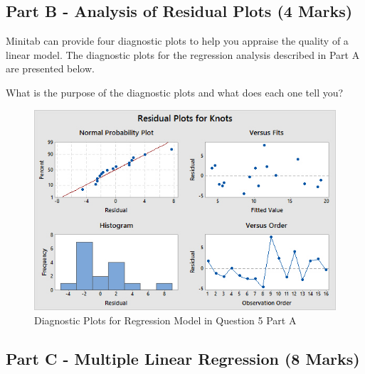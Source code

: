 \documentclass[a4paper,12pt]{article}
\begin{document}
%	
%	
%	
\newpage

\subsection*{Part B - Analysis of Residual Plots (4 Marks)}
Minitab can provide four diagnostic plots to help you appraise the quality of a linear model. The diagnostic plots for the regression analysis described in Part A are presented below. \\ \medskip

\noindent What is the purpose of the diagnostic plots and what does each one tell you?

\bigskip

\begin{figure}[h!]
\centering
\includegraphics[width=0.9\linewidth]{"images/Residual Plots for Knots"}
\caption{Diagnostic Plots for Regression Model in Question 5 Part A}
\label{fig:ResidualPlotsforKnots}
\end{figure}




\newpage

\subsection*{Part C - Multiple Linear Regression (8 Marks)}
\end{document}
